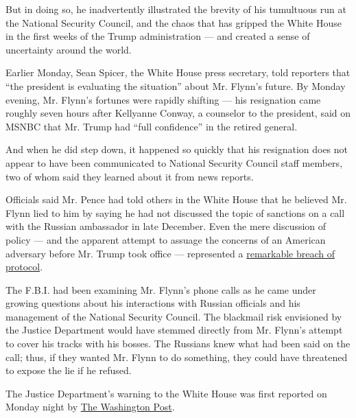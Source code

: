 But in doing so, he inadvertently illustrated the brevity of his
tumultuous run at the National Security Council, and the chaos that has
gripped the White House in the first weeks of the Trump administration
--- and created a sense of uncertainty around the world.

Earlier Monday, Sean Spicer, the White House press secretary, told
reporters that ``the president is evaluating the situation'' about Mr.
Flynn's future. By Monday evening, Mr. Flynn's fortunes were rapidly
shifting --- his resignation came roughly seven hours after Kellyanne
Conway, a counselor to the president, said on MSNBC that Mr. Trump had
``full confidence'' in the retired general.

And when he did step down, it happened so quickly that his resignation
does not appear to have been communicated to National Security Council
staff members, two of whom said they learned about it from news reports.

Officials said Mr. Pence had told others in the White House that he
believed Mr. Flynn lied to him by saying he had not discussed the topic
of sanctions on a call with the Russian ambassador in late December.
Even the mere discussion of policy --- and the apparent attempt to
assuage the concerns of an American adversary before Mr. Trump took
office --- represented a
\href{http://www.dod.mil/dodgc/defense_ethics/resource_library/summary_emoluments_clause_restrictions.pdf}{remarkable
breach of protocol}.

The F.B.I. had been examining Mr. Flynn's phone calls as he came under
growing questions about his interactions with Russian officials and his
management of the National Security Council. The blackmail risk
envisioned by the Justice Department would have stemmed directly from
Mr. Flynn's attempt to cover his tracks with his bosses. The Russians
knew what had been said on the call; thus, if they wanted Mr. Flynn to
do something, they could have threatened to expose the lie if he
refused.

The Justice Department's warning to the White House was first reported
on Monday night by
\href{https://www.washingtonpost.com/world/national-security/justice-department-warned-white-house-that-flynn-could-be-vulnerable-to-russian-blackmail-officials-say/2017/02/13/fc5dab88-f228-11e6-8d72-263470bf0401_story.html?hpid=hp_rhp-top-table-main_flynn-0818pm\%3Ahomepage\%2Fstory\&utm_term=.5bdf89b8ea34}{The
Washington Post}.

\href{https://www.nytimes.com/interactive/2017/02/13/us/politics/document-Michael-Flynn-Resignation-Letter.html}{}


